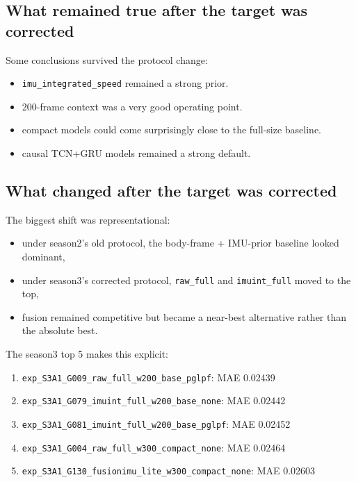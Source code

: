 \documentclass[11pt,a4paper]{article}
\begin{document}
\subsection{What remained true after the target was corrected}

Some conclusions survived the protocol change:

\begin{itemize}
\item \texttt{imu\_integrated\_speed} remained a strong prior.
\item 200-frame context was a very good operating point.
\item compact models could come surprisingly close to the full-size baseline.
\item causal TCN+GRU models remained a strong default.
\end{itemize}

\subsection{What changed after the target was corrected}

The biggest shift was representational:

\begin{itemize}
\item under season2's old protocol, the body-frame + IMU-prior baseline looked dominant,
\item under season3's corrected protocol, \texttt{raw\_full} and \texttt{imuint\_full} moved to the top,
\item fusion remained competitive but became a near-best alternative rather than the absolute best.
\end{itemize}

The season3 top 5 makes this explicit:

\begin{enumerate}
\item \texttt{exp\_S3A1\_G009\_raw\_full\_w200\_base\_pglpf}: MAE 0.02439
\item \texttt{exp\_S3A1\_G079\_imuint\_full\_w200\_base\_none}: MAE 0.02442
\item \texttt{exp\_S3A1\_G081\_imuint\_full\_w200\_base\_pglpf}: MAE 0.02452
\item \texttt{exp\_S3A1\_G004\_raw\_full\_w300\_compact\_none}: MAE 0.02464
\item \texttt{exp\_S3A1\_G130\_fusionimu\_lite\_w300\_compact\_none}: MAE 0.02603
\end{enumerate}
\end{document}
